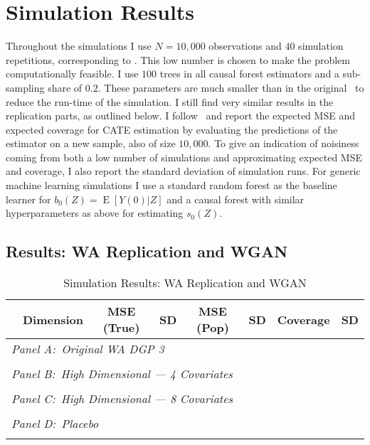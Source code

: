 \documentclass[11pt, a4paper, leqno]{article}
\DeclareMathOperator{\E}{E}
\begin{document}
\section{Simulation Results}
Throughout the simulations I use $N=10,000$ observations and $40$ simulation repetitions, corresponding to \cite{wager2018estimation}.
This low number is chosen to make the problem computationally feasible.
I use $100$ trees in all causal forest estimators and a sub-sampling share of $0.2$.
These parameters are much smaller than in the original~\cite{wager2018estimation} to reduce the run-time of the simulation.
I still find very similar results in the replication parts, as outlined below.
I follow~\cite{wager2018estimation} and report the expected MSE and expected coverage for CATE estimation by evaluating the predictions of the estimator on a new sample, also of size $10,000$.
To give an indication of noisiness coming from both a low number of simulations and approximating expected MSE and coverage, I also report the standard deviation of simulation runs.
For generic machine learning simulations I use a standard random forest as the baseline learner for $b_0(Z) = \E[Y(0)|Z]$ and a causal forest with similar hyperparameters as above for estimating $s_0(Z)$.

\subsection{Results: WA Replication and WGAN}

\begin{table}
    \caption{Simulation Results: WA Replication and WGAN}
    \center
    \begin{tabular}{lccccccc}
        & Dimension & MSE (True) & SD & MSE (Pop) & SD & Coverage & SD \\
        \toprule
        \multicolumn{8}{l}{\textit{Panel A:\ Original WA DGP 3}} \\
         \\
        \midrule

        \multicolumn{8}{l}{\textit{Panel B:\ High Dimensional --- 4 Covariates}} \\
         \\
        \midrule

        \multicolumn{8}{l}{\textit{Panel C:\ High Dimensional --- 8 Covariates}} \\
         \\
        \midrule

        \multicolumn{8}{l}{\textit{Panel D:\ Placebo}} \\
         \\
        \bottomrule
    \end{tabular}

\end{table}
\end{document}
